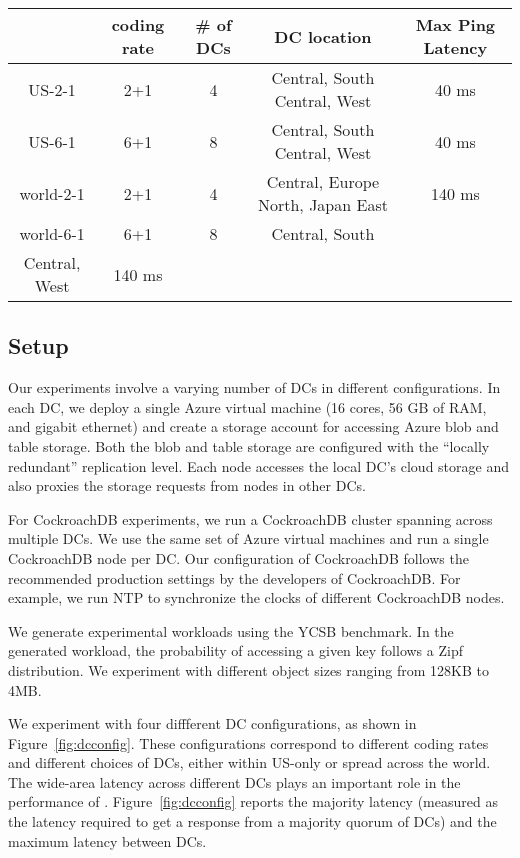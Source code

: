 \begin{figure*}
\begin{tabular}{c|c|c|c|c}
& coding rate & \# of DCs & DC location & Max Ping Latency\\
\hline
US-2-1 & 2+1 & 4 & Central, South Central, West & 40 ms\\
US-6-1 & 6+1 & 8 & Central, South Central, West& 40 ms\\ 
world-2-1 & 2+1 & 4 & Central, Europe North, Japan East & 140 ms\\
world-6-1 & 6+1 & 8 & Central, South \\ Central, West & 140 ms\\
\end{tabular}
\caption{The DC configurations and inter-DC latencies in various experiments~\label{fig:dcconfig}} 
\end{figure*}

\subsection{Setup}
Our experiments involve a varying number of DCs in different configurations. In
each DC, we deploy a single Azure virtual machine (16 cores, 56 GB of RAM, and
gigabit ethernet) and create a storage account for accessing Azure blob and
table storage. Both the blob and table storage are configured with the
``locally redundant'' replication level.  Each \name node accesses the local
DC's cloud storage and also proxies the storage requests from \name nodes in
other DCs.  

For CockroachDB experiments, we run a CockroachDB cluster spanning across
multiple DCs.  We use the same set of Azure virtual machines and run a single
CockroachDB node per DC. Our configuration of CockroachDB follows the
recommended production settings by the developers of CockroachDB. For example,
we run NTP to synchronize the clocks of different CockroachDB nodes. 

We generate experimental workloads using the YCSB benchmark. In the generated
workload, the probability of accessing a given key follows a Zipf distribution.
We experiment with different object sizes ranging from 128KB to 4MB. 

We experiment with four diffferent DC configurations, as shown in
Figure~\ref{fig:dcconfig}.  These configurations correspond to different coding
rates and different choices of DCs, either within US-only or spread across the
world. The wide-area latency across different DCs plays an important role in 
the performance of \name.  Figure~\ref{fig:dcconfig} reports the majority
latency (measured as the latency required to get a response from a majority
quorum of DCs) and the maximum latency between DCs.

